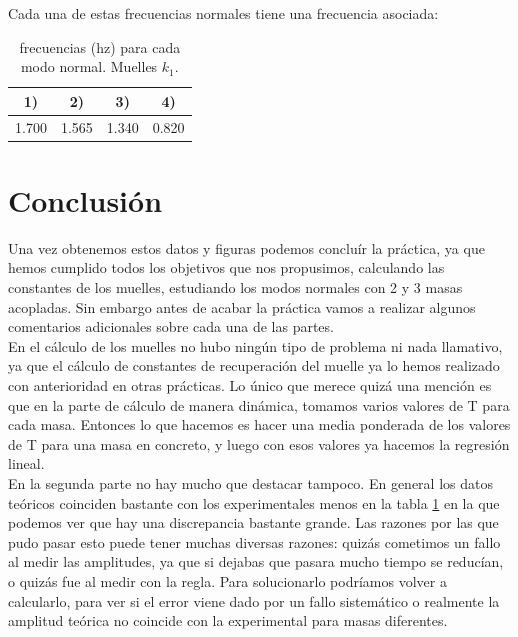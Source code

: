 \documentclass[12pt,a4paper]{article}
\begin{document}
Cada una de estas frecuencias normales tiene una frecuencia asociada:




\begin{table}[h!] \centering 
\begin{tabular}{|c|c|c|c|}  
\hline
  1) & 2) & 3) & 4) \\
\hline
  1.700 & 1.565 & 1.340 & 0.820 \\
\hline
\end{tabular} 
\caption{frecuencias (hz) para cada modo normal. Muelles $k_1$.}
\label{tab:7} 
\end{table}


\section{Conclusión}

Una vez obtenemos estos datos y figuras podemos concluír la práctica, ya que hemos cumplido todos los objetivos que nos propusimos, calculando las constantes de los muelles, estudiando los modos normales con 2 y 3 masas acopladas. Sin embargo antes de acabar la práctica vamos a realizar algunos comentarios adicionales sobre cada una de las partes. \\

En el cálculo de los muelles no hubo ningún tipo de problema ni nada llamativo, ya que el cálculo de constantes de recuperación del muelle ya lo hemos realizado con anterioridad en otras prácticas. Lo único que merece quizá una mención es que en la parte de cálculo de manera dinámica, tomamos varios valores de T para cada masa. Entonces lo que hacemos es hacer una media ponderada de los valores de T para una masa en concreto, y luego con esos valores ya hacemos la regresión lineal. \\

En la segunda parte no hay mucho que destacar tampoco. En general los datos teóricos coinciden bastante con los experimentales menos en la tabla \ref{tab:7} en la que podemos ver que hay una discrepancia bastante grande. Las razones por las que pudo pasar esto puede tener muchas diversas razones: quizás cometimos un fallo al medir las amplitudes, ya que si dejabas que pasara mucho tiempo se reducían, o quizás fue al medir con la regla. Para solucionarlo podríamos volver a calcularlo, para ver si el error viene dado por un fallo sistemático o realmente la amplitud teórica no coincide con la experimental para masas diferentes.  \\
\end{document}
